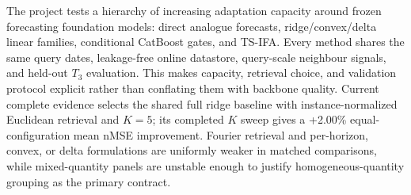 \documentclass[10pt]{article}
\newcommand{\Tthree}{T_3}
\begin{document}
The project tests a hierarchy of increasing adaptation capacity around frozen
forecasting foundation models: direct analogue forecasts, ridge/convex/delta
linear families, conditional CatBoost gates, and TS-IFA. Every method
shares the same query dates, leakage-free online datastore, query-scale
neighbour signals, and held-out $\Tthree$ evaluation. This makes capacity,
retrieval choice, and validation protocol explicit rather than conflating them
with backbone quality. Current complete evidence selects the shared full ridge
baseline with instance-normalized Euclidean retrieval and $K=5$; its completed
$K$ sweep gives a +2.00\% equal-configuration mean nMSE improvement. Fourier
retrieval and per-horizon, convex, or delta formulations are uniformly weaker
in matched comparisons, while mixed-quantity panels are unstable enough to
justify homogeneous-quantity grouping as the primary contract.



\end{document}
